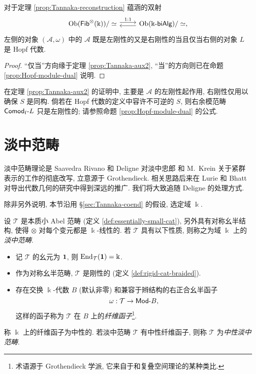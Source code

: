 \begin{corollary}\label{prop:Hopf-vs-dual}
	对于定理 \ref{prop:Tannaka-reconstruction} 蕴涵的双射
	\[\begin{tikzcd}
		\Obj(\cate{Fib}^{\otimes}(\Bbbk))/\simeq \arrow[shift left, r, "{1:1}"] & \Obj(\Bbbk\dcate{biAlg}) /\simeq , \arrow[shift left, l]
	\end{tikzcd}\]
	左侧的对象 $(\mathcal{A}, \omega)$ 中的 $\mathcal{A}$ 既是左刚性的又是右刚性的当且仅当右侧的对象 $L$ 是 Hopf 代数.
\end{corollary}
\begin{proof}
	``仅当''方向缘于定理 \ref{prop:Tannaka-aux2}, ``当''的方向则已在命题 \ref{prop:Hopf-module-dual} 说明.
\end{proof}

在定理 \ref{prop:Tannaka-aux2} 的证明中, 主要是 $\mathcal{A}$ 的左刚性起作用, 右刚性仅用以确保 $S$ 是同构. 倘若在 Hopf 代数的定义中容许不可逆的 $S$, 则右余模范畴 $\mathsf{Comod}_{\mathrm{f}}\text{-}L$ 只是左刚性的; 请参照命题 \ref{prop:Hopf-module-dual} 的公式.

\section{淡中范畴}\label{sec:Tannakian-cat}
淡中范畴理论是 Saavedra Rivano 和 Deligne \cite{Sa72, Del90} 对淡中忠郎 \cite{Ta38} 和 M.\ Krein \cite{Kr49} 关于紧群表示的工作的彻底改写, 立意源于 Grothendieck. 相关思路后来在 Lurie 和 Bhatt 对导出代数几何的研究中得到深远的推广. 我们将大致追随 Deligne 的处理方式.

除非另外说明, 本节沿用 \S\ref{sec:Tannaka-coend} 的假设, 选定域 $\Bbbk$.

\begin{definition}\label{def:Tannakian-cat}
	设 $\mathcal{T}$ 是本质小 Abel 范畴 (定义 \ref{def:essentially-small-cat}), 另外具有对称幺半结构, 使得 $\otimes$ 对每个变元都是 $\Bbbk$-线性的. 若 $\mathcal{T}$ 具有以下性质, 则称之为域 $\Bbbk$ 上的\emph{淡中范畴}.
	\begin{itemize}
		\item 记 $\mathcal{T}$ 的幺元为 $\bm{1}$, 则 $\operatorname{End}_{\mathcal{T}}(\bm{1}) = \Bbbk$.
		\item 作为对称幺半范畴, $\mathcal{T}$ 是刚性的 (定义 \ref{def:rigid-cat-braided}).
		\item 存在交换 $\Bbbk$-代数 $B$ (默认非零) 和兼容于辫结构的右正合幺半函子
		\[ \omega: \mathcal{T} \to \mathsf{Mod}\text{-}B, \]
		这样的函子称为 $\mathcal{T}$ 在 $B$ 上的\emph{纤维函子}\footnote{术语源于 Grothendieck 学派, 它来自于和复叠空间理论的某种类比.}.
	\end{itemize}
	
	称 $\Bbbk$ 上的纤维函子为中性的. 若淡中范畴 $\mathcal{T}$ 有中性纤维函子, 则称 $\mathcal{T}$ 为\emph{中性淡中范畴}.
\end{definition}

